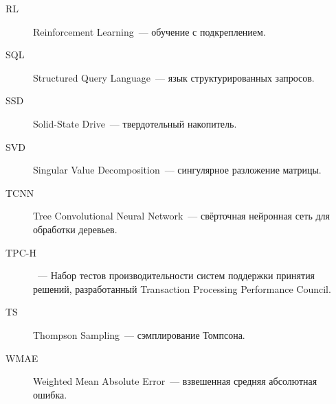 \begin{description}
\item[RL] Reinforcement Learning~--- обучение
с подкреплением.

\item[SQL] Structured Query Language~--- язык
структурированных запросов.

\item[SSD] Solid-State Drive~--- твердотельный накопитель.

\item[SVD] Singular Value Decomposition~--- сингулярное
разложение матрицы.

\item[TCNN] Tree Convolutional Neural Network~---
свёрточная нейронная сеть для обработки деревьев.

\item[TPC-H]~--- Набор тестов производительности систем
поддержки принятия решений, разработанный
Transaction Processing Performance Council.

\item[TS] Thompson Sampling~--- сэмплирование Томпсона.

\item[WMAE] Weighted Mean Absolute Error~--- взвешенная
средняя абсолютная ошибка.

\end{description}
